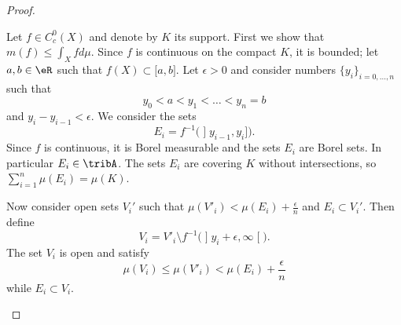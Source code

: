 \begin{proof}
\begin{subproof}
		Let \( f\in C_c^0(X)\) and denote by \( K\) its support. First we show that \( m(f)\leq \int_Xfd\mu\). Since \( f\) is continuous on the compact \( K\), it is bounded; let \( a,b\in \eR\) such that \( f(X)\subset \mathopen[ a , b \mathclose]\). Let \( \epsilon>0\) and consider numbers \( \{ y_i \}_{i=0,\ldots, n}\) such that
		\begin{equation}
			y_0<a<y_1<\ldots<y_n=b
		\end{equation}
		and \( y_i-y_{i-1}<\epsilon\). We consider the sets
		\begin{equation}
			E_i=f^{-1}\big( \mathopen] y_{i-1} , y_i \mathclose] \big).
		\end{equation}
		Since \( f\) is continuous, it is Borel measurable and the sets \( E_i\) are Borel sets. In particular \( E_i\in\tribA\). The sets \( E_i\) are covering \( K\) without intersections, so \( \sum_{i=1}^n\mu(E_i)=\mu(K)\).

		Now consider open sets \( V_i'\) such that \( \mu(V'_i)<\mu(E_i)+\frac{ \epsilon }{ n }\) and \( E_i\subset V_i'\). Then define
		\begin{equation}
			V_i=V'_i\setminus f^{-1}\big( \mathopen] y_i+\epsilon , \infty \mathclose[ \big).
		\end{equation}
		The set \( V_i\) is open and satisfy
		\begin{equation}
			\mu(V_i)\leq\mu(V'_i)<\mu(E_i)+\frac{ \epsilon }{ n }
		\end{equation}
		while \( E_i\subset V_i\).


\end{subproof}
\end{proof}
